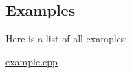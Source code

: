 \subsection{Examples}
Here is a list of all examples:\begin{DoxyCompactItemize}
\item 
\hyperlink{example_8cpp-example}{example.cpp}
\end{DoxyCompactItemize}
